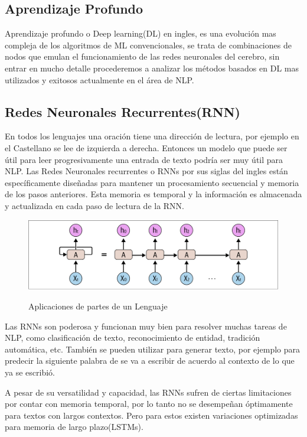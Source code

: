 \subsection{Aprendizaje Profundo}

Aprendizaje profundo o Deep learning(DL) en ingles, es una evolución mas compleja de los algoritmos de ML convencionales,
se trata de combinaciones de nodos que emulan el funcionamiento de las redes neuronales del cerebro, sin entrar en mucho detalle procederemos a analizar los métodos basados en DL mas utilizados y exitosos actualmente en el área de NLP.

\subsection{Redes Neuronales Recurrentes(RNN)}

En todos los lenguajes una oración tiene una dirección de lectura, por ejemplo en el Castellano se lee de izquierda a derecha. Entonces un modelo que puede ser útil para leer progresivamente una entrada de texto podría ser muy útil para NLP. Las Redes Neuronales recurrentes o RNNs por sus siglas del ingles están específicamente diseñadas para mantener
un procesamiento secuencial y memoria de los pasos anteriores. Esta memoria es temporal y la información es almacenada y 
actualizada en cada paso de lectura de la RNN. 

\begin{figure}[h]
    \centering
    \includegraphics[width=\textwidth]{imagenes/Cap 2/rnn.png}
    \caption{Aplicaciones de partes de un Lenguaje}
    \label{fig:RNN}
    \cite{sowmya_practical_npl}
\end{figure}

Las RNNs son poderosa y funcionan muy bien para resolver muchas tareas de NLP, como clasificación de texto, reconocimiento
de entidad, tradición automática, etc. También se pueden utilizar para generar texto, por ejemplo para predecir la 
siguiente palabra de se va a escribir de acuerdo al contexto de lo que ya se escribió.

A pesar de su versatilidad y capacidad, las RNNs sufren de ciertas limitaciones por contar con memoria temporal, por lo 
tanto no se desempeñan óptimamente para textos con largos contextos. Pero para estos existen variaciones optimizadas para 
memoria de largo plazo(LSTMs). 



